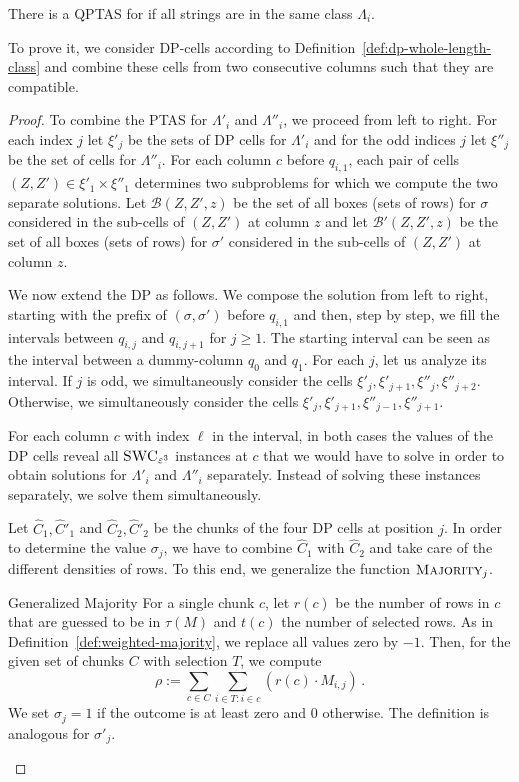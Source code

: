 \begin{lemma}\label{lem:length-class}
    There is a QPTAS for \GMEC if all strings are in the same class $\Lambda_i$.
\end{lemma}
To prove it, we consider DP-cells according to Definition~\ref{def:dp-whole-length-class} and combine these cells from two consecutive columns such that they are compatible. 
\begin{proof}
    To combine the PTAS for $\Lambda'_i$ and $\Lambda''_i$, we proceed from left to right.
    For each index $j$ let $\xi'_j$ be the sets of DP cells for $\Lambda'_i$ and for the odd indices $j$ let $\xi''_j$ be the set of cells for $\Lambda''_i$.
    For each column $c$ before $q_{i,1}$, each pair of cells $(Z,Z') \in \xi'_1 \times \xi''_1$ determines two subproblems for which we compute the two separate solutions.
    Let $\mathcal{B}(Z,Z',z)$ be the set of all boxes (sets of rows) for $\sigma$ considered in the sub-cells of $(Z,Z')$ at column $z$ and
    let $\mathcal{B}'(Z,Z',z)$ be the set of all boxes (sets of rows) for $\sigma'$ considered in the sub-cells of $(Z,Z')$ at column $z$. 

    We now extend the DP as follows.
    We compose the solution from left to right, starting with the prefix of $(\sigma,\sigma')$ before $q_{i,1}$ and then, step by step, we fill the intervals between $q_{i,j}$ and $q_{i,j+1}$ for $j \ge 1$.
    The starting interval can be seen as the interval between a dummy-column $q_0$ and $q_1$.
    For each $j$, let us analyze its interval. 
    If $j$ is odd, we simultaneously consider the cells $\xi'_j,\xi'_{j+1},\xi''_j, \xi''_{j+2}$.
    Otherwise, we simultaneously consider the cells $\xi'_j,\xi'_{j+1},\xi''_{j-1}, \xi''_{j+1}$.

    For each column $c$ with index $\ell$ in the interval, in both cases the values of the DP cells reveal all $\textsc{SWC}_{\varepsilon^3}$ instances at $c$ that we would have to solve in order to obtain solutions for $\Lambda'_i$ and $\Lambda''_i$ separately.
    Instead of solving these instances separately, we solve them simultaneously.

    Let $\hat{C}_1, \hat{C}'_1$ and $\hat{C}_2,\hat{C}'_2$ be the chunks of the four DP cells at position $j$.
    In order to determine the value $\sigma_j$, we have to combine $\hat{C}_1$ with $\hat{C}_2$ and take care of the different densities of rows.
    To this end, we generalize the function $\textsc{Majority}_j$.
    \begin{definition}{Generalized Majority}
        \label{def:generalized-majority}
        For a single chunk $c$, let $r(c)$ be the number of rows in $c$ that are guessed to be in $\tau(M)$ and $t(c)$ the number of selected rows.
        As in Definition~\ref{def:weighted-majority}, we replace all values zero by $-1$.
        Then, for the given set of chunks $C$ with selection $T$, we compute 
        \[
            \rho := \sum_{c \in C} \sum_{i \in T\colon i \in c} (r(c) \cdot M_{i,j})\,.
        \]
        We set $\sigma_j = 1$ if the outcome is at least zero and $0$ otherwise.    
        The definition is analogous for $\sigma'_j$.
    \end{definition}


\end{proof}
